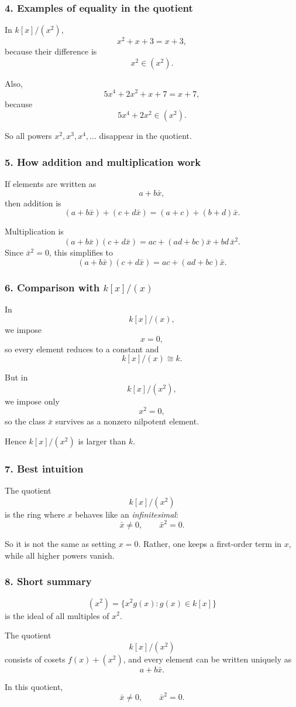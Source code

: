 \documentclass[12pt,a4paper]{article}
\theoremstyle{plain}
\theoremstyle{definition}      %
\begin{document}
	\subsubsection*{4. Examples of equality in the quotient}
	
	In \(k[x]/(x^2)\),
	\[
	x^2+x+3 = x+3,
	\]
	because their difference is
	\[
	x^2\in (x^2).
	\]
	
	Also,
	\[
	5x^4+2x^2+x+7 = x+7,
	\]
	because
	\[
	5x^4+2x^2\in (x^2).
	\]
	
	So all powers \(x^2,x^3,x^4,\dots\) disappear in the quotient.
	
	\subsubsection*{5. How addition and multiplication work}
	
	If elements are written as
	\[
	a+b\bar x,
	\]
	then addition is
	\[
	(a+b\bar x)+(c+d\bar x)=(a+c)+(b+d)\bar x.
	\]
	
	Multiplication is
	\[
	(a+b\bar x)(c+d\bar x)
	=
	ac+(ad+bc)\bar x+bd\,\bar x^2.
	\]
	Since \(\bar x^2=0\), this simplifies to
	\[
	(a+b\bar x)(c+d\bar x)=ac+(ad+bc)\bar x.
	\]
	
	\subsubsection*{6. Comparison with \(k[x]/(x)\)}
	
	In
	\[
	k[x]/(x),
	\]
	we impose
	\[
	x=0,
	\]
	so every element reduces to a constant and
	\[
	k[x]/(x)\cong k.
	\]
	
	But in
	\[
	k[x]/(x^2),
	\]
	we impose only
	\[
	x^2=0,
	\]
	so the class \(\bar x\) survives as a nonzero nilpotent element.
	
	Hence \(k[x]/(x^2)\) is larger than \(k\).
	
	\subsubsection*{7. Best intuition}
	
	The quotient
	\[
	k[x]/(x^2)
	\]
	is the ring where \(x\) behaves like an \emph{infinitesimal}:
	\[
	\bar x\neq 0,
	\qquad
	\bar x^2=0.
	\]
	
	So it is not the same as setting \(x=0\).
	Rather, one keeps a first-order term in \(x\), while all higher powers vanish.
	
	\subsubsection*{8. Short summary}
	
	\[
	(x^2)=\{x^2g(x):g(x)\in k[x]\}
	\]
	is the ideal of all multiples of \(x^2\).
	
	The quotient
	\[
	k[x]/(x^2)
	\]
	consists of cosets \(f(x)+(x^2)\), and every element can be written uniquely as
	\[
	a+b\bar x.
	\]
	
	In this quotient,
	\[
	\bar x\neq 0,
	\qquad
	\bar x^2=0.
	\]
	
	
\end{document}
